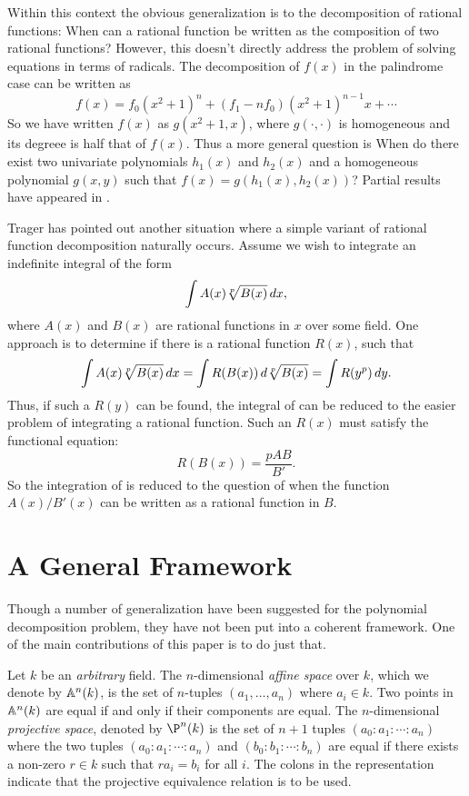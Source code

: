 Within this context the obvious generalization is to the decomposition of
rational functions: When can a rational function be written as the
composition of two rational functions?  However, this doesn't directly
address the problem of solving equations in terms of radicals.  
The decomposition of $f(x)$ in the palindrome case can be written as
\[
f(x) = f_0 (x^2+1)^n + (f_1 - n f_0)(x^2+1)^{n-1} x + \cdots 
\]
So we have written $f(x)$ as $g(x^2+1, x)$, where $g(\cdot, \cdot)$ is
homogeneous and its degreee is half that of $f(x)$.  Thus a more
general question is When do there exist two univariate polynomials $h_1(x)$
and $h_2(x)$ and a homogeneous polynomial $g(x,y)$ such that $f(x) =
g(h_1(x), h_2(x))$?  Partial results have appeared in \cite{Weis1992-tb}.

\medskip
Trager has pointed out another situation where a simple variant of
rational function decomposition naturally occurs.  Assume we wish to
integrate an indefinite integral of the form
\begin{equation}
\label{Integral:Radical:Eq}
\int A(x) \root p \of{B(x)} \, dx,
\end{equation}
where $A(x)$ and $B(x)$ are rational functions in $x$ over some field.
One approach is to determine if there is a rational function $R(x)$,
such that
\[
\int A(x) \root p \of{B(x)} \, dx = \int R(B(x)) \, d\root p \of{B(x)}
  = \int R(y^p) \, dy.
\]
Thus, if such a $R(y)$ can be found, the integral of
 can be reduced to the easier problem of
integrating a rational function.  Such an $R(x)$ must satisfy the
functional equation:
\[
R(B(x)) = \frac{p A B}{B'}.
\]
So the integration of  is reduced to the
question of when the function $A(x)/B'(x)$ can be written as a
rational function in $B$.

\section{A General Framework}
\label{Vector:Framework:Sec}

Though a number of generalization have been suggested for the
polynomial decomposition problem, they have not been put into a
coherent framework.  One of the main contributions of this paper is to
do just that.

Let $k$ be an {\em arbitrary} field.  The $n$-dimensional {\em affine
space} over $k$, which we denote by $\mathbb{A}^n(k)$, is the set of
$n$-tuples $(a_1, \ldots, a_n)$ where $a_i \in k$.  Two points in
$\mathbb{A}^n(k)$ are equal if and only if their components are equal.  The
$n$-dimensional {\em projective space}, denoted by $\P^n(k)$ is the
set of $n+1$ tuples $(a_0: a_1: \cdots : a_n)$ where the two tuples
$(a_0: a_1: \cdots : a_n)$ and $(b_0: b_1: \cdots : b_n)$ are equal if
there exists a non-zero $r \in k$ such that $r a_i = b_i$ for all $i$.
The colons in the representation indicate that the projective
equivalence relation is to be used.

